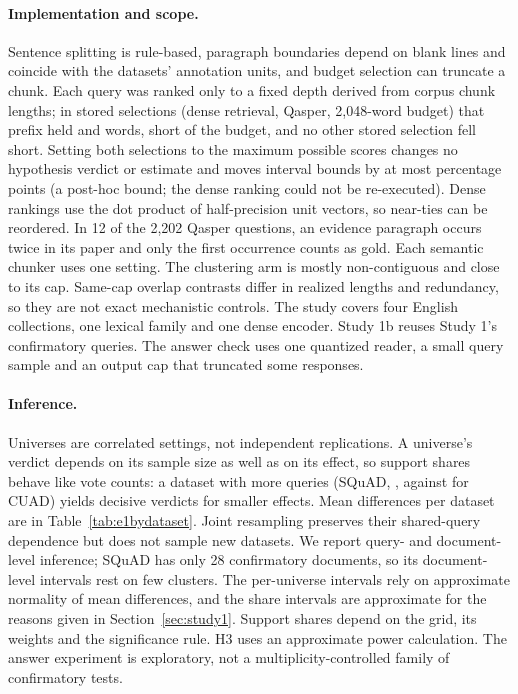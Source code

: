 \documentclass[11pt]{article}
\begin{document}
\paragraph{Implementation and scope.}
Sentence splitting is rule-based, paragraph boundaries depend on blank lines and coincide with the datasets' annotation units, and budget selection can truncate a chunk. Each query was ranked only to a fixed depth derived from corpus chunk lengths; in \UnderfillCells{} stored selections (dense retrieval, Qasper, 2,048-word budget) that prefix held \UnderfillWordsA{} and \UnderfillWordsB{} words, short of the budget, and no other stored selection fell short. Setting both selections to the maximum possible scores changes no hypothesis verdict or estimate and moves interval bounds by at most \UnderfillMaxShift{} percentage points (a post-hoc bound; the dense ranking could not be re-executed). Dense rankings use the dot product of half-precision unit vectors, so near-ties can be reordered. In 12 of the 2,202 Qasper questions, an evidence paragraph occurs twice in its paper and only the first occurrence counts as gold. Each semantic chunker uses one setting. The clustering arm is mostly non-contiguous and close to its cap. Same-cap overlap contrasts differ in realized lengths and redundancy, so they are not exact mechanistic controls. The study covers four English collections, one lexical family and one dense encoder. Study 1b reuses Study 1's confirmatory queries. The answer check uses one quantized reader, a small query sample and an output cap that truncated some responses.

\paragraph{Inference.}
Universes are correlated settings, not independent replications. A universe's verdict depends on its sample size as well as on its effect, so support shares behave like vote counts: a dataset with more queries (SQuAD, \EoneNqSquadtwo{}, against \EoneNqCuad{} for CUAD) yields decisive verdicts for smaller effects. Mean differences per dataset are in Table~\ref{tab:e1bydataset}. Joint resampling preserves their shared-query dependence but does not sample new datasets. We report query- and document-level inference; SQuAD has only 28 confirmatory documents, so its document-level intervals rest on few clusters. The per-universe intervals rely on approximate normality of mean differences, and the share intervals are approximate for the reasons given in Section~\ref{sec:study1}. Support shares depend on the grid, its weights and the significance rule. H3 uses an approximate power calculation. The answer experiment is exploratory, not a multiplicity-controlled family of confirmatory tests.
\end{document}
